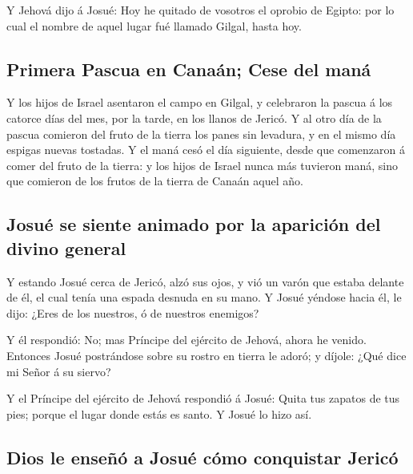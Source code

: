  Y Jehová dijo á Josué: Hoy he quitado de vosotros el
oprobio de Egipto: por lo cual el nombre de aquel lugar fué llamado
Gilgal, hasta hoy.

\hypertarget{primera-pascua-en-canauxe1n-cese-del-manuxe1}{%
\subsection{Primera Pascua en Canaán; Cese del
maná}\label{primera-pascua-en-canauxe1n-cese-del-manuxe1}}

 Y los hijos de Israel asentaron el campo en Gilgal, y
celebraron la pascua á los catorce días del mes, por la tarde, en los
llanos de Jericó.  Y al otro día de la pascua comieron
del fruto de la tierra los panes sin levadura, y en el mismo día espigas
nuevas tostadas.  Y el maná cesó el día siguiente, desde
que comenzaron á comer del fruto de la tierra: y los hijos de Israel
nunca más tuvieron maná, sino que comieron de los frutos de la tierra de
Canaán aquel año.

\hypertarget{josuuxe9-se-siente-animado-por-la-apariciuxf3n-del-divino-general}{%
\subsection{Josué se siente animado por la aparición del divino
general}\label{josuuxe9-se-siente-animado-por-la-apariciuxf3n-del-divino-general}}

 Y estando Josué cerca de Jericó, alzó sus ojos, y vió un
varón que estaba delante de él, el cual tenía una espada desnuda en su
mano. Y Josué yéndose hacia él, le dijo: ¿Eres de los nuestros, ó de
nuestros enemigos?

 Y él respondió: No; mas Príncipe del ejército de Jehová,
ahora he venido. Entonces Josué postrándose sobre su rostro en tierra le
adoró; y díjole: ¿Qué dice mi Señor á su siervo?

 Y el Príncipe del ejército de Jehová respondió á Josué:
Quita tus zapatos de tus pies; porque el lugar donde estás es santo. Y
Josué lo hizo así.

\hypertarget{dios-le-enseuxf1uxf3-a-josuuxe9-cuxf3mo-conquistar-jericuxf3}{%
\subsection{Dios le enseñó a Josué cómo conquistar
Jericó}\label{dios-le-enseuxf1uxf3-a-josuuxe9-cuxf3mo-conquistar-jericuxf3}}

